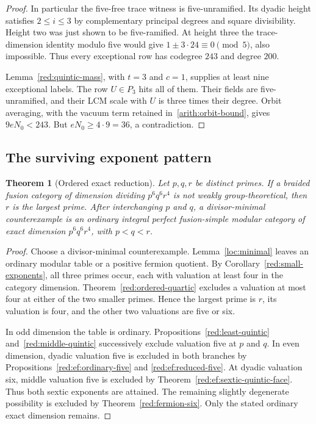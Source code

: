 \documentclass[11pt,a4paper]{article}
\numberwithin{equation}{section}
\newtheorem{theorem}{Theorem}[section]
\begin{document}
\begin{proof}
In particular the five-free trace witness is five-unramified.
Its dyadic height satisfies $2\le i\le3$ by complementary principal
degrees and square divisibility. Height two was just shown to be
five-ramified. At height three the trace-dimension identity modulo
five would give $1\pm3\cdot24\equiv0\pmod5$, also impossible.
Thus every exceptional row has codegree $243$ and degree $200$.

Lemma~\ref{red:quintic-mass}, with $t=3$ and $c=1$, supplies at
least nine exceptional labels. The row $U\in P_3$ hits all of them.
Their fields are five-unramified, and their LCM scale with $U$ is
three times their degree. Orbit averaging, with the vacuum term
retained in~\eqref{arith:orbit-bound}, gives $9eN_0<243$. But $eN_0\ge4\cdot9=36$, a
contradiction.
\end{proof}

\subsection{The surviving exponent pattern}
\label{red:ordered-even}

\begin{theorem}[Ordered exact reduction]\label{red:exact-reduction}
Let $p,q,r$ be distinct primes. If a braided fusion category of dimension
dividing $p^6q^6r^4$ is not weakly group-theoretical, then $r$ is the
largest prime. After interchanging $p$ and $q$, a divisor-minimal
counterexample is an ordinary integral perfect fusion-simple modular
category of exact dimension $p^6q^6r^4$, with $p<q<r$.
\end{theorem}
\begin{proof}
Choose a divisor-minimal counterexample. Lemma~\ref{loc:minimal}
leaves an ordinary modular table or a positive fermion quotient.
By Corollary~\ref{red:small-exponents}, all three primes occur,
each with valuation at least four in the category dimension.
Theorem~\ref{red:ordered-quartic} excludes a valuation at most four
at either of the two smaller primes. Hence the largest prime is $r$,
its valuation is four, and the other two valuations are five or six.

In odd dimension the table is ordinary.
Propositions~\ref{red:least-quintic} and~\ref{red:middle-quintic}
successively exclude valuation five at $p$ and $q$. In even dimension, dyadic valuation five is excluded in both
branches by Propositions~\ref{red:ef:ordinary-five} and
\ref{red:ef:reduced-five}. At dyadic valuation six, middle
valuation five is excluded by Theorem~\ref{red:ef:sextic-quintic-face}.
Thus both sextic exponents are attained. The remaining
slightly degenerate possibility is excluded by Theorem~\ref{red:fermion-six}. Only the stated ordinary exact dimension remains.
\end{proof}
\end{document}
